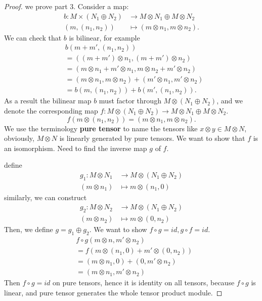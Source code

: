 \documentclass[11pt]{article}
\newcommand{\rta}{\rightarrow}
\newcommand{\lrta}{\longrightarrow}
\begin{document}
\begin{proof}
we prove part 3. Consider a map: 
$$
\begin{aligned}
b:M\times (N_1\oplus N_2)&\rta M\otimes N_1 \oplus M\otimes N_2\\
(m,(n_1,n_2))&\mapsto (m\otimes n_1, m\otimes n_2).
\end{aligned}
$$
We can check that $b$ is bilinear, for example 
$$
\begin{aligned}
&b(m+m',(n_1,n_2))\\
&=((m+m')\otimes n_1,(m+m')\otimes n_2)\\
&= (m\otimes n_1+m'\otimes n_1,m\otimes n_2+m'\otimes n_2)\\
&=(m\otimes n_1,m\otimes n_2)+(m'\otimes n_1,m'\otimes n_2)\\
&=b(m,(n_1,n_2))+b(m',(n_1,n_2)).
\end{aligned}
$$
As a result the bilinear map $b$ must factor through $M\otimes (N_1\oplus N_2)$, and we denote the corresponding map $f:M\otimes (N_1\oplus N_2)\rta M\otimes N_1 \oplus M\otimes N_2$.
$$
f(m\otimes (n_1,n_2))=(m\otimes n_1,m\otimes n_2).
$$
We use the terminology \textbf{pure tensor} to name the tensors like $x\otimes y\in M\otimes N$, obviously, $M\otimes N$ is linearly generated by  pure tensors.
We want to show that $f$ is an isomorphism. Need to find the inverse map $g$ of $f$.

define 
$$
\begin{aligned}
g_1:M\otimes N_1&\lrta M\otimes(N_1\oplus N_2)\\
(m\otimes n_1)&\longmapsto m\otimes (n_1,0)
\end{aligned}
$$
similarly, we can construct 
$$
\begin{aligned}
g_2:M\otimes N_2&\lrta M\otimes(N_1\oplus N_2)\\
(m\otimes n_2)&\longmapsto m\otimes (0,n_2)
\end{aligned}
$$
Then, we define $g=g_1\oplus g_2$. We want to show $f\circ g=id, g\circ f=id$.
$$
\begin{aligned}
&f\circ g(m\otimes n,m'\otimes n_2)\\
&=f(m\otimes (n_1,0)+m'\otimes(0,n_2))\\
&=(m\otimes n_1,0)+(0,m'\otimes n_2)\\
&=(m\otimes n_1,m'\otimes n_2)
\end{aligned}
$$
Then $f\circ g=id $ on pure tensors, hence it is identity on all tensors, because $f\circ g$ is linear, and pure tensor generates the whole tensor product module.
\end{proof}
\end{document}
